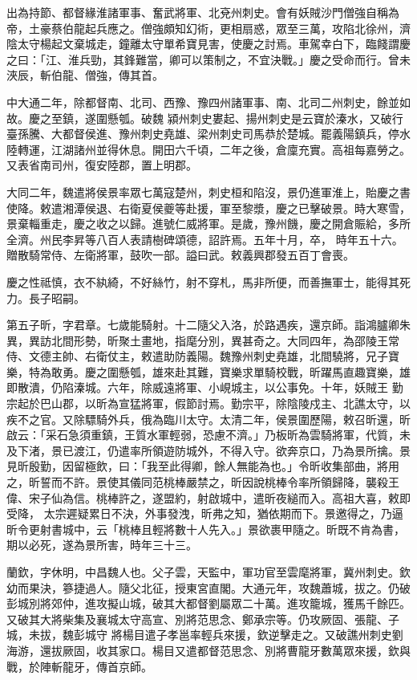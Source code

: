 \begin{pinyinscope}
 出為持節、都督緣淮諸軍事、奮武將軍、北兗州刺史。會有妖賊沙門僧強自稱為帝，土豪蔡伯龍起兵應之。僧強頗知幻術，更相扇惑，眾至三萬，攻陷北徐州，濟陰太守楊起文棄城走，鐘離太守單希寶見害，使慶之討焉。車駕幸白下，臨餞謂慶之曰：「江、淮兵勁，其鋒難當，卿可以策制之，不宜決戰。」慶之受命而行。曾未浹辰，斬伯龍、僧強，傳其首。



 中大通二年，除都督南、北司、西豫、豫四州諸軍事、南、北司二州刺史，餘並如故。慶之至鎮，遂圍懸瓠。破魏
 潁州刺史婁起、揚州刺史是云寶於溱水，又破行臺孫騰、大都督侯進、豫州刺史堯雄、梁州刺史司馬恭於楚城。罷義陽鎮兵，停水陸轉運，江湖諸州並得休息。開田六千頃，二年之後，倉廩充實。高祖每嘉勞之。又表省南司州，復安陸郡，置上明郡。



 大同二年，魏遣將侯景率眾七萬寇楚州，刺史桓和陷沒，景仍進軍淮上，貽慶之書使降。敕遣湘潭侯退、右衛夏侯夔等赴援，軍至黎漿，慶之已擊破景。時大寒雪，景棄輜重走，慶之收之以歸。進號仁威將軍。是歲，豫州饑，慶之開倉賑給，多所全濟。州民李昇等八百人表請樹碑頌德，詔許焉。五年十月，卒，
 時年五十六。贈散騎常侍、左衛將軍，鼓吹一部。謚曰武。敕義興郡發五百丁會喪。



 慶之性祗慎，衣不紈綺，不好絲竹，射不穿札，馬非所便，而善撫軍士，能得其死力。長子昭嗣。



 第五子昕，字君章。七歲能騎射。十二隨父入洛，於路遇疾，還京師。詣鴻臚卿朱異，異訪北間形勢，昕聚土畫地，指麾分別，異甚奇之。大同四年，為邵陵王常侍、文德主帥、右衛仗主，敕遣助防義陽。魏豫州刺史堯雄，北間驍將，兄子寶樂，特為敢勇。慶之圍懸瓠，雄來赴其難，寶樂求單騎校戰，昕躍馬直趣寶樂，雄即散潰，仍陷溱城。六年，除威遠將軍、小峴城主，以公事免。十年，妖賊王
 勤宗起於巴山郡，以昕為宣猛將軍，假節討焉。勤宗平，除陰陵戍主、北譙太守，以疾不之官。又除驃騎外兵，俄為臨川太守。太清二年，侯景圍歷陽，敕召昕還，昕啟云：「采石急須重鎮，王質水軍輕弱，恐慮不濟。」乃板昕為雲騎將軍，代質，未及下渚，景已渡江，仍遣率所領遊防城外，不得入守。欲奔京口，乃為景所擒。景見昕殷勤，因留極飲，曰：「我至此得卿，餘人無能為也。」令昕收集部曲，將用之，昕誓而不許。景使其儀同范桃棒嚴禁之，昕因說桃棒令率所領歸降，襲殺王偉、宋子仙為信。桃棒許之，遂盟約，射啟城中，遣昕夜縋而入。高祖大喜，敕即受降，
 太宗遲疑累日不決，外事發洩，昕弗之知，猶依期而下。景邀得之，乃逼昕令更射書城中，云「桃棒且輕將數十人先入。」景欲裹甲隨之。昕既不肯為書，期以必死，遂為景所害，時年三十三。



 蘭欽，字休明，中昌魏人也。父子雲，天監中，軍功官至雲麾將軍，冀州刺史。欽幼而果決，篸捷過人。隨父北征，授東宮直閣。大通元年，攻魏蕭城，拔之。仍破彭城別將郊仲，進攻擬山城，破其大都督劉屬眾二十萬。進攻籠城，獲馬千餘匹。又破其大將柴集及襄城太守高宣、別將范思念、鄭承宗等。仍攻厥固、張龍、子城，未拔，魏彭城守
 將楊目遣子孝邕率輕兵來援，欽逆擊走之。又破譙州刺史劉海游，還拔厥固，收其家口。楊目又遣都督范思念、別將曹龍牙數萬眾來援，欽與戰，於陣斬龍牙，傳首京師。




\end{pinyinscope}
